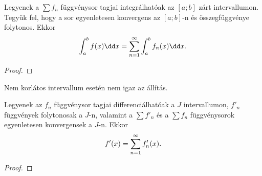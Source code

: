 \begin{theorem}
  Legyenek a $\sum f_n$ függvénysor tagjai integrálhatóak az $[a; b]$ zárt
  intervallumon. Tegyük fel, hogy a sor egyenletesen konvergens az $[a; b]$-n
  és összegfüggvénye folytonos. Ekkor
  $$
    \int_a^b f(x) \dd x = \sum_{n = 1}^{\infty} \int_a^b f_n(x) \dd x
    \text.
  $$

  \begin{proof}
    \vspace{7em}
  \end{proof}
\end{theorem}

\begin{note}
  Nem korlátos intervallum esetén nem igaz az állítás.
\end{note}

\begin{theorem}
  Legyenek az $f_n$ függvénysor tagjai differenciálhatóak a $J$ intervallumon,
  $f'_n$ függvények folytonosak a $J$-n, valamint a $\sum f'_n$ és a $\sum f_n$
  függvénysorok egyenletesen konvergensek a $J$-n. Ekkor
  $$
    f'(x) = \sum_{n = 1}^{\infty} f'_n(x)
    \text.
  $$

  \begin{proof}
    \vspace{7em}
  \end{proof}
\end{theorem}

